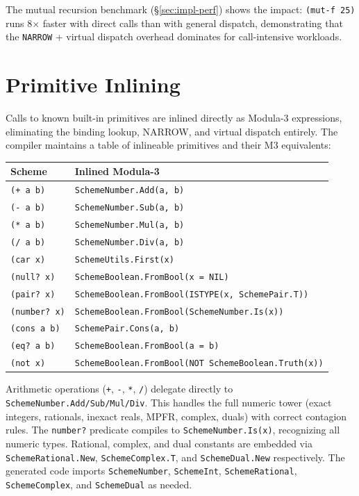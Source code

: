 \documentclass[12pt]{report}
\begin{document}
The mutual recursion benchmark (\S\ref{sec:impl-perf}) shows the
impact: \texttt{(mut-f 25)} runs 8$\times$ faster with direct
calls than with general dispatch, demonstrating that the
\texttt{NARROW} + virtual dispatch overhead dominates for
call-intensive workloads.

\section{Primitive Inlining}
\label{sec:opt-inline}

Calls to known built-in primitives are inlined directly as
Modula-3 expressions, eliminating the binding lookup, NARROW, and
virtual dispatch entirely.  The compiler maintains a table of
inlineable primitives and their M3 equivalents:

\begin{center}
\begin{tabular}{ll}
\toprule
\textbf{Scheme} & \textbf{Inlined Modula-3} \\
\midrule
\texttt{(+ a b)}     & \texttt{SchemeNumber.Add(a, b)} \\
\texttt{(- a b)}     & \texttt{SchemeNumber.Sub(a, b)} \\
\texttt{(* a b)}     & \texttt{SchemeNumber.Mul(a, b)} \\
\texttt{(/ a b)}     & \texttt{SchemeNumber.Div(a, b)} \\
\texttt{(car x)}     & \texttt{SchemeUtils.First(x)} \\
\texttt{(null? x)}   & \texttt{SchemeBoolean.FromBool(x = NIL)} \\
\texttt{(pair? x)}   & \texttt{SchemeBoolean.FromBool(ISTYPE(x, SchemePair.T))} \\
\texttt{(number? x)} & \texttt{SchemeBoolean.FromBool(SchemeNumber.Is(x))} \\
\texttt{(cons a b)}  & \texttt{SchemePair.Cons(a, b)} \\
\texttt{(eq? a b)}   & \texttt{SchemeBoolean.FromBool(a = b)} \\
\texttt{(not x)}     & \texttt{SchemeBoolean.FromBool(NOT SchemeBoolean.Truth(x))} \\
\bottomrule
\end{tabular}
\end{center}

\noindent
Arithmetic operations (\texttt{+}, \texttt{-}, \texttt{*},
\texttt{/}) delegate directly to
\texttt{SchemeNumber.Add/Sub/Mul/Div}.  This handles the full numeric
tower (exact integers, rationals, inexact reals, MPFR, complex, duals)
with correct contagion rules.  The \texttt{number?} predicate
compiles to \texttt{SchemeNumber.Is(x)}, recognizing all numeric types.
Rational, complex, and dual constants are embedded via
\texttt{SchemeRational.New}, \texttt{SchemeComplex.T},
and \texttt{SchemeDual.New} respectively.  The generated code imports
\texttt{SchemeNumber}, \texttt{SchemeInt}, \texttt{SchemeRational},
\texttt{SchemeComplex}, and \texttt{SchemeDual} as needed.
\end{document}
